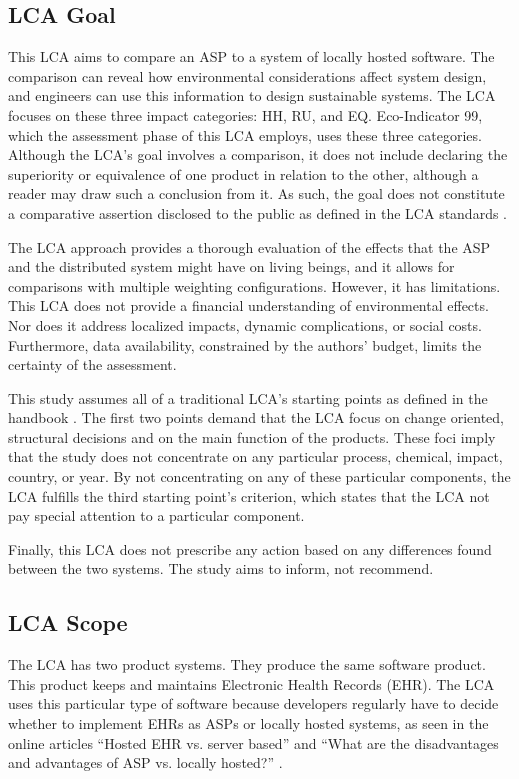\documentclass[final,journal,10pt,letterpaper,oneside,twocolumn,compsoc]%
{IEEEtran}
\begin{document}
\subsection{LCA Goal}
This LCA aims to compare an ASP to a system of
locally hosted software. The comparison can reveal how environmental
considerations affect system design, and engineers can use this
information to design sustainable systems. The LCA focuses
on these three impact categories: HH, RU, and EQ. Eco-Indicator 99, which the
assessment phase of this LCA  employs,
uses these three categories. Although the LCA's goal involves a comparison, it
does not include declaring the superiority or equivalence of one product in
relation to the other, although a reader may draw such a conclusion from it. As
such, the goal
does not constitute a comparative assertion disclosed to the public as defined
in the LCA standards \cite{lca}.

The LCA approach provides a
thorough evaluation of the effects that the ASP and the distributed system might
have on living beings, and it allows for comparisons with multiple weighting
configurations. However, it has limitations. This LCA does not provide a
financial understanding
of environmental effects. Nor does it address localized impacts, dynamic
complications, or social costs. Furthermore, data availability, constrained by
the authors' budget, limits the certainty of the assessment. 

This study assumes all of a traditional LCA's starting points as defined in the
handbook \cite{lca}. The first two points demand that the LCA
focus on change oriented, structural decisions and on the main
function of the
products. These foci imply that the study does not concentrate on any particular
process, chemical, impact, country, or year. By not concentrating on any of
these
particular components, the LCA fulfills the third starting point's criterion,
which states that the LCA not pay special attention to a particular component.

Finally, this LCA does not prescribe any action based on any differences found
between the two systems. The study aims to inform, not recommend.

\subsection{LCA Scope}
The LCA has two product systems. They produce the same software product. This
product keeps and maintains Electronic Health Records (EHR). The LCA uses this
particular type of software because developers regularly have to decide whether
to
implement EHRs as ASPs or locally hosted systems, as seen in the online articles
``Hosted EHR vs. server based'' and ``What are the disadvantages and
advantages of ASP vs. locally hosted?'' \cite{mds} \cite{hrsa}.
\end{document}
